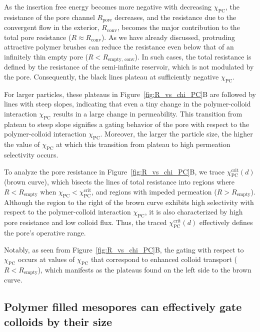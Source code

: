 \documentclass[12pt, a4paper]{article}
\begin{document}
As the insertion free energy becomes more negative with decreasing $\chi_{\textrm{PC}}$, the resistance of the pore channel $R_{\textrm{pore}}$ decreases, and the resistance due to the convergent flow in the exterior, $R_{\textrm{conv}}$, becomes the major contribution to the total pore resistance ($R \approx R_{\textrm{conv}}$).
As we have already discussed, protruding attractive polymer brushes can reduce the resistance even below that of an infinitely thin empty pore ($R < R_{\textrm{empty, conv}}$).
In such cases, the total resistance is defined by the resistance of the semi-infinite reservoir, which is not modulated by the pore.
Consequently, the black lines plateau at sufficiently negative $\chi_{\textrm{PC}}$.

For larger particles, these plateaus in Figure~\ref{fig:R_vs_chi_PC}B are followed by lines with steep slopes, indicating that even a tiny change in the polymer-colloid interaction $\chi_{\textrm{PC}}$ results in a large change in permeability.
This transition from plateau to steep slope signifies a gating behavior of the pore with respect to the polymer-colloid interaction $\chi_{\textrm{PC}}$.
Moreover, the larger the particle size, the higher the value of $\chi_{\textrm{PC}}$ at which this transition from plateau to high permeation selectivity occurs.

To analyze the pore resistance in Figure~\ref{fig:R_vs_chi_PC}B, we trace $\chi_{\textrm{PC}}^{\textrm{crit}}(d)$ (brown curve), which bisects the lines of total resistance into regions where $R < R_{\textrm{empty}}$ when $\chi_{\textrm{PC}} < \chi_{\textrm{PC}}^{\textrm{crit}}$, and regions with impeded permeation ($R > R_{\textrm{empty}}$).
Although the region to the right of the brown curve exhibits high selectivity with respect to the polymer-colloid interaction $\chi_{\textrm{PC}}$, it is also characterized by high pore resistance and low colloid flux.
Thus, the traced $\chi_{\textrm{PC}}^{\textrm{crit}}(d)$ effectively defines the pore's operative range.

Notably, as seen from Figure~\ref{fig:R_vs_chi_PC}B, the gating with respect to $\chi_{\textrm{PC}}$ occurs at values of $\chi_{\textrm{PC}}$ that correspond to enhanced colloid transport ($R < R_{\textrm{empty}}$), which manifests as the plateaus found on the left side to the brown curve.

\subsection{Polymer filled mesopores can effectively gate colloids by their size}
\end{document}
